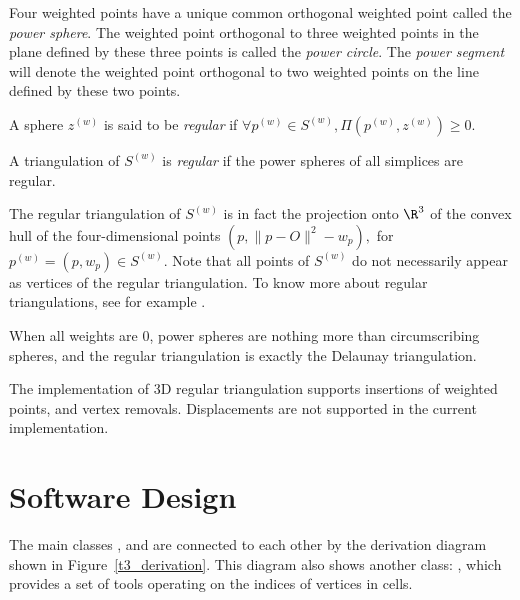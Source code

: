Four weighted points have a unique common orthogonal weighted point
called the \textit{power sphere}.  The weighted point orthogonal to
three weighted points in the plane defined by these three points is
called the \textit{power circle}. The
\textit{power segment} will denote the weighted point orthogonal to
two weighted points on the line defined by these two points.

A sphere ${z}^{(w)}$ is said to be
\textit{regular} if $\forall {p}^{(w)}\in{S}^{(w)},
\Pi{({p}^{(w)},{z}^{(w)})}\geq 0$.

A triangulation of ${S}^{(w)}$ is \textit{regular} if the power spheres
of all simplices are regular. 

The regular triangulation of
${S}^{(w)}$ is in fact the projection onto $\R^3$ of the convex hull 
of the four-dimensional points $(p,\|p-O\|^2-w_p),$ for
${p}^{(w)}=(p,w_p)\in{S}^{(w)}$. 
Note that all points of ${S}^{(w)}$ do not
necessarily appear as vertices of the regular
triangulation. To know more about regular triangulations, see for
example \cite{es-itfwr-96}. 

When all weights are 0, power spheres are nothing more than
circumscribing spheres, and the regular triangulation is exactly the
Delaunay triangulation.

The implementation of 3D regular triangulation supports insertions of weighted points, and vertex removals. Displacements are not supported in the current implementation.

\section{Software Design\label{Triangulation3-sec-design}}

The main classes ,  and
 are connected to each other by the
derivation diagram shown in Figure~\ref{t3_derivation}.  This diagram
also shows another class: , which provides
a set of tools operating on the indices of vertices in cells.

